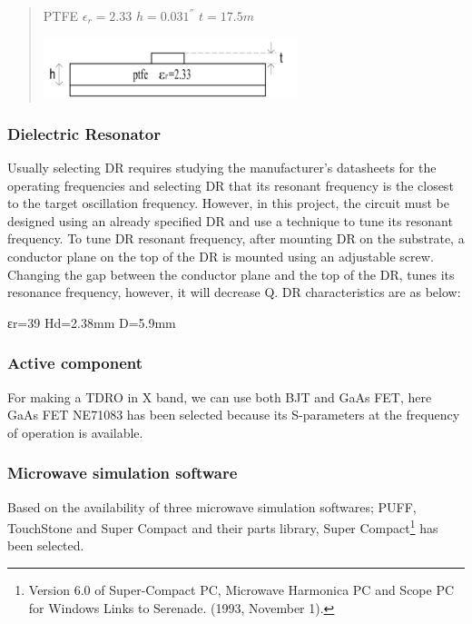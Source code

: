 \begin{quote}
PTFE \(\epsilon_{r} = 2.33\) \({h = 0.031}^{''}\) \(t = 17.5m\)

\includegraphics[width=2.91667in,height=0.69444in]{media/image13.png}
\end{quote}

\hypertarget{dielectric-resonator}{%
\subsubsection{\texorpdfstring{ Dielectric
Resonator}{ Dielectric Resonator}}\label{dielectric-resonator}}

Usually selecting DR requires studying the manufacturer's datasheets for
the operating frequencies and selecting DR that its resonant frequency
is the closest to the target oscillation frequency. However, in this
project, the circuit must be designed using an already specified DR and
use a technique to tune its resonant frequency. To tune DR resonant
frequency, after mounting DR on the substrate, a conductor plane on the
top of the DR is mounted using an adjustable screw. Changing the gap
between the conductor plane and the top of the DR, tunes its resonance
frequency, however, it will decrease Q. DR characteristics are as below:

εr=39 Hd=2.38mm D=5.9mm

\hypertarget{active-component}{%
\subsubsection{\texorpdfstring{ Active
component}{ Active component}}\label{active-component}}

For making a TDRO in X band, we can use both BJT and GaAs FET, here GaAs
FET NE71083 has been selected because its S-parameters at the frequency
of operation is available.

\hypertarget{microwave-simulation-software}{%
\subsubsection{\texorpdfstring{ Microwave simulation
software}{ Microwave simulation software}}\label{microwave-simulation-software}}

Based on the availability of three microwave simulation softwares; PUFF,
TouchStone and Super Compact and their parts library, Super
Compact\footnote{Version 6.0 of Super-Compact PC, Microwave Harmonica PC
  and Scope PC for Windows Links to Serenade. (1993, November 1).} has
been selected.

